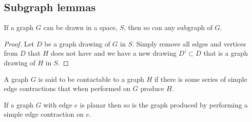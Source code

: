 \documentclass{article}
\begin{document}
\subsection{Subgraph lemmas} \label{SubGraphSec}

\begin{lemma} \label{subgraph}
	If a graph $G$ can be drawn in a space, $S$, then so can any subgraph of $G$.
\end{lemma}

\begin{proof}
	Let $D$ be a graph drawing of $G$ in $S$. Simply remove all edges and vertices from $D$ that $H$ does not have and we have a new drawing $D'\subset D$ that is a graph drawing of $H$ in $S$.
\end{proof}

\begin{definition}[contactable]
	A graph $G$ is said to be contactable to a graph $H$ if there is some series of simple edge contractions that when performed on $G$ produce $H$.
\end{definition}

\begin{lemma}
	If a graph $G$ with edge $e$ is planar then so is the graph produced by performing a simple edge contraction on $e$.
\end{lemma}
\end{document}
